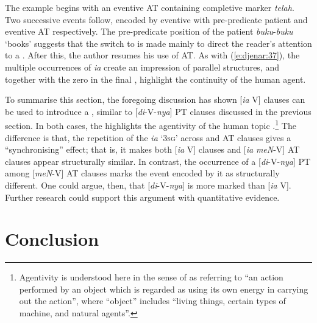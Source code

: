 \documentclass[output=paper
,modfonts
,nonflat]{langsci/langscibook}
\begin{document}
\noindent
The example begins with an eventive AT  containing completive marker \textit{telah}. Two successive events follow, encoded by eventive   with pre-predicate patient and eventive AT  respectively. The pre-predicate position of the patient \textit{buku}-\textit{buku} ‘books’ suggests that the switch to  is made mainly to direct the reader’s attention to a . After this, the author resumes his use of AT. As with (\ref{e:djenar:37}), the multiple occurrences of \textit{ia} create an impression of parallel structures, and together with the zero in the final , highlight the continuity of the human agent. 

To summarise this section, the foregoing discussion has shown [\textit{ia} V]  clauses can be used to introduce a , similar to [\textit{di}-V-\textit{nya}] PT clauses discussed in the previous section. In both cases, the  highlights the agentivity of the human topic .\footnote{Agentivity is understood here in the sense of \citet[21]{Cruse1973} as referring to “an action performed by an object which is regarded as using its own energy in carrying out the action”, where “object” includes “living things, certain types of machine, and natural agents”.}  The difference is that, the repetition of the  \textit{ia} ‘\textsc{3sg}’ across  and AT clauses gives a “synchronising” effect; that is, it makes both [\textit{ia} V]  clauses and [\textit{ia} \textit{meN}-V] AT clauses appear structurally similar. In contrast, the occurrence of a [\textit{di}-V-\textit{nya}] PT  among [\textit{meN}-V] AT clauses marks the event encoded by it as structurally different. One could argue, then, that [\textit{di}-V-\textit{nya}] is more marked than [\textit{ia} V]. Further research could support this argument with quantitative evidence.

\section{\label{s:djenar:7}Conclusion}
\end{document}
